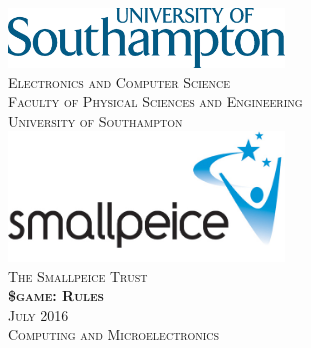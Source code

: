 \documentclass[twoside,12pt,a4paper,titlepage]{article}
\title{\gamename}
\author{\org}
\date{\timeline}
\newcommand{\gamename}{\$game\xspace}
\newcommand{\timeline}{July 2016\xspace}
\begin{document}
\begin{titlepage}
\begin{center}
\includegraphics[width=0.55\textwidth]{./soton_logo.eps}~\\[1cm]
\textsc{\large Electronics and Computer Science}\\[0.2cm]
\textsc{\large Faculty of Physical Sciences and Engineering}\\[0.2cm]
\textsc{\large University of Southampton}\\[3.5cm]
\includegraphics[width=0.55\textwidth]{./smallpeice_logo.jpg}~\\[1cm]
\textsc{\large The Smallpeice Trust}\\[3.5cm]
\textsc{\huge \textbf{\gamename{}: Rules}}\\[1cm]
\textsc{\large \timeline}\\[3cm]
\textsc{\Large Computing and Microelectronics}
\end{center}
\end{titlepage}


\clearpage

\clearpage

\clearpage

\end{document}

